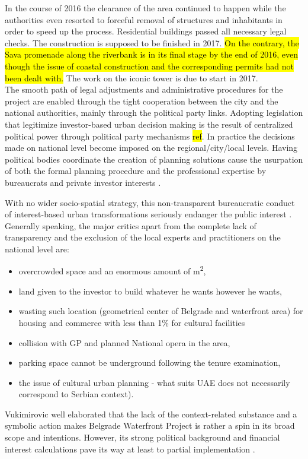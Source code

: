 \documentclass[11pt]{report}
\begin{document}
\begin{itemize}
In the course of 2016 the clearance of the area continued to happen while the authorities even resorted to forceful removal of structures and inhabitants in order to speed up the process.
Residential buildings passed all necessary legal checks. The construction is supposed to be finished in 2017. \hl{On the contrary, the Sava promenade along the riverbank is in its final stage by the end of 2016, even though the issue of coastal construction and the corresponding permits had not been dealt with.} The work on the iconic tower is due to start in 2017.
\\
The smooth path of legal adjustments and administrative procedures for the project are enabled through the tight cooperation between the city and the national authorities, mainly through the political party links\footnotemark \cite{Maruna 2015, Peric 2016}. Adopting legislation that legitimize investor-based urban decision making is the result of centralized political power through political party mechanisms \hl{ref}. In practice the decisions made on national level become imposed on the regional/city/local levels.
Having political bodies coordinate the creation of planning solutions cause the usurpation of both the formal planning procedure and the professional expertise by bureaucrats and private investor interests \cite{Maruna 2015, Peric 2016}.

With no wider socio-spatial strategy, this non-transparent bureaucratic conduct of interest-based urban transformations seriously endanger the public interest \cite{Vukmirovic in Doytchinov et al 2015}. 
Generally speaking, the major critics apart from the complete lack of transparency and the exclusion of the local experts and practitioners on the national level are:
\begin{itemize}
\item overcrowded space and an enormous amount of m\textsuperscript{2},
\item land given to the investor to build whatever he wants however he wants,
\item wasting such location (geometrical center of Belgrade and waterfront area) for housing and commerce with less than 1\% for cultural facilities
\item collision with GP and planned National opera in the area,
\item parking space cannot be underground following the tenure examination,
\item the issue of cultural urban planning - what suits UAE does not necessarily correspond to Serbian context).
\end{itemize}
Vukimirovic well elaborated that the lack of the context-related substance and a symbolic action makes Belgrade Waterfront Project is rather a spin in its broad scope and intentions. However, its strong political background and financial interest calculations pave its way at least to partial implementation \cite{Vukmirovic in Doytchinov et al 2015}.
\end{itemize}
\end{document}

